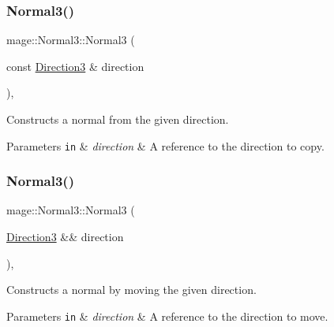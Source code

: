 \subsubsection{\texorpdfstring{Normal3()}{Normal3()}\hspace{0.1cm}{\footnotesize\ttfamily [5/8]}}
{\footnotesize\ttfamily mage\+::\+Normal3\+::\+Normal3 (\begin{DoxyParamCaption}\item[{const \hyperlink{structmage_1_1_direction3}{Direction3} \&}]{direction }\end{DoxyParamCaption})\hspace{0.3cm}{\ttfamily [explicit]}, {\ttfamily [noexcept]}}

Constructs a normal from the given direction.


\begin{DoxyParams}[1]{Parameters}
\mbox{\tt in}  & {\em direction} & A reference to the direction to copy. \\
\hline
\end{DoxyParams}
\hypertarget{structmage_1_1_normal3_a55d265ba8454dd5d4573ad9d09844cee}{}\label{structmage_1_1_normal3_a55d265ba8454dd5d4573ad9d09844cee} 
\subsubsection{\texorpdfstring{Normal3()}{Normal3()}\hspace{0.1cm}{\footnotesize\ttfamily [6/8]}}
{\footnotesize\ttfamily mage\+::\+Normal3\+::\+Normal3 (\begin{DoxyParamCaption}\item[{\hyperlink{structmage_1_1_direction3}{Direction3} \&\&}]{direction }\end{DoxyParamCaption})\hspace{0.3cm}{\ttfamily [explicit]}, {\ttfamily [noexcept]}}

Constructs a normal by moving the given direction.


\begin{DoxyParams}[1]{Parameters}
\mbox{\tt in}  & {\em direction} & A reference to the direction to move. \\
\hline
\end{DoxyParams}
\hypertarget{structmage_1_1_normal3_ad812f4b279f8ef1a28f71925c90efcf8}{}\label{structmage_1_1_normal3_ad812f4b279f8ef1a28f71925c90efcf8} 
